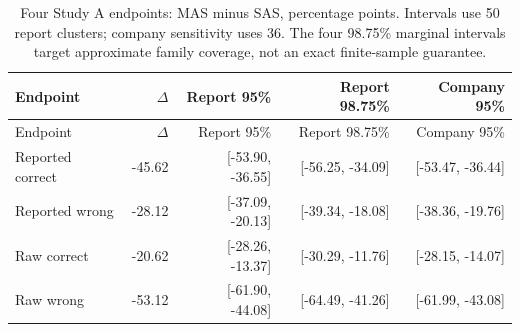 \begin{longtable}{lrrrr}
\caption{Four Study A endpoints: MAS minus SAS, percentage points. Intervals use 50 report clusters; company sensitivity uses 36. The four 98.75\% marginal intervals target approximate family coverage, not an exact finite-sample guarantee.}\label{tab:primary-ci}\\
Endpoint & $\Delta$ & Report 95\% & Report 98.75\% & Company 95\%\\\toprule\endfirsthead
Endpoint & $\Delta$ & Report 95\% & Report 98.75\% & Company 95\%\\\toprule\endhead
Reported correct & -45.62 & [-53.90, -36.55] & [-56.25, -34.09] & [-53.47, -36.44]\\
Reported wrong & -28.12 & [-37.09, -20.13] & [-39.34, -18.08] & [-38.36, -19.76]\\
Raw correct & -20.62 & [-28.26, -13.37] & [-30.29, -11.76] & [-28.15, -14.07]\\
Raw wrong & -53.12 & [-61.90, -44.08] & [-64.49, -41.26] & [-61.99, -43.08]\\
\bottomrule\end{longtable}